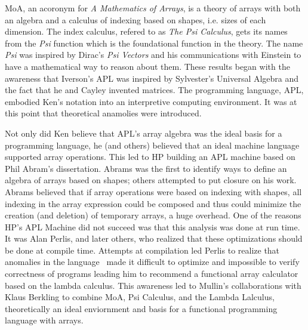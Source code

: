 \newcommand{\cat}{+\!\!\!+}
\newcommand{\Take}{\mbox{Take}}
\newcommand{\take}{\,\bigtriangleup\,}
\newcommand{\Drop}{\mbox{Drop}}
\newcommand{\drop}{\,\bigtriangledown\,}
\newcommand{\rshp}{\,\widehat{\Rho}\;}
\newcommand{\Rho}{\,\rho\,}
\newcommand{\Tau}{\,\tau\,}
\newcommand{\Dim}{\,\delta\,}
\newcommand{\transpose}{\bigcirc\!\!\!\!\!\backslash\;}
\newcommand{\kron}{\bigcirc\,\!\!\!\!\!\!\times\;}
\newcommand{\Ravel}{\,\mbox{\tt rav}\,}
\newcommand{\Gradeup}{\,\mbox{\tt gu}\,}

\newtheorem{definition}{Definition}
\newtheorem{corollary}{Corollary}
\newtheorem{theorem}{Theorem}

\noindent

MoA, an acoronym for {\em A Mathematics of Arrays\cite{thesis}}, is a theory of arrays with both an algebra and a calculus of 
indexing based on shapes, i.e. sizes of each dimension. The index calculus, refered to as {\em The Psi Calculus}, 
gets its names from the {\em Psi}  function which is the foundational function in the theory. The name {\em Psi} 
was inspired by Dirac's {\em Psi Vectors} and his communications with Einstein to have a mathematical way to reason
about them. These results began with the awareness that Iverson's APL\cite{iverson62}
was inspired by Sylvester's Universal Algebra\cite{sylvester} and the fact that he and Cayley invented matrices.
The programming language, APL, embodied Ken's notation into an interpretive computing environment. It was at this point
that theoretical anamolies were introduced. 

Not only did  Ken believe that APL's array algebra was the ideal basis for a programming language, he (and others) believed that
an ideal machine language supported array operations. This led to HP building an 
APL machine based on Phil Abram's dissertation\cite{abrams70}. Abrams was the first to identify ways 
to define an algebra of arrays based on shapes; others attempted to
put closure on his work\cite{lyon,guibas}. Abrams believed that if array operations were based on 
indexing with  shapes, all  indexing in the array expression could be  composed
and  thus could minimize the creation (and deletion) of temporary arrays,
a huge overhead. One of the reasons HP's APL Machine did not succeed was that this analysis was done at run time.
It was  Alan Perlis, and later others\cite{miller,budd84},  who realized that these optimizations should be done at compile time. Attempts at compilation led Perlis to realize that  anomalies in the language~\cite{gerhart} 
made it difficult to optimize and impossible to verify correctness of 
programs leading him to recommend a functional array calculator based on the lambda 
calculus\cite{tu2,tu3}. This awareness led to Mullin's collaborations with Klaus Berkling to combine MoA, Psi Calculus, and
the Lambda Lalculus, theoretically an ideal enviornment\cite{berkling} and basis for a 
functional programming language with 
arrays\cite{mul91,budd91,hm92,mul93,mul94,mul96}. 



